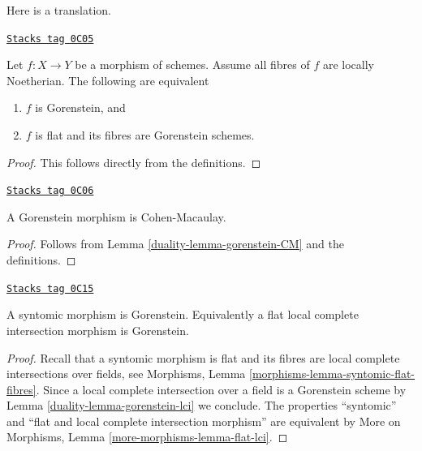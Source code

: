Here is a translation.

\begin{lemma}
\label{duality-lemma-gorenstein-morphism}
\href{https://stacks.math.columbia.edu/tag/0C05}{\texttt{Stacks tag 0C05}}

Let $f : X \to Y$ be a morphism of schemes.
Assume all fibres of $f$ are locally Noetherian.
The following are equivalent
\begin{enumerate}
\item $f$ is Gorenstein, and
\item $f$ is flat and its fibres are Gorenstein schemes.
\end{enumerate}
\end{lemma}

\begin{proof}
This follows directly from the definitions.
\end{proof}

\begin{lemma}
\label{duality-lemma-gorenstein-CM-morphism}
\href{https://stacks.math.columbia.edu/tag/0C06}{\texttt{Stacks tag 0C06}}

A Gorenstein morphism is Cohen-Macaulay.
\end{lemma}

\begin{proof}

Follows from Lemma \ref{duality-lemma-gorenstein-CM} and the definitions.
\end{proof}

\begin{lemma}
\label{duality-lemma-lci-gorenstein}
\href{https://stacks.math.columbia.edu/tag/0C15}{\texttt{Stacks tag 0C15}}

A syntomic morphism is Gorenstein. Equivalently a flat
local complete intersection morphism is Gorenstein.
\end{lemma}

\begin{proof}

Recall that a syntomic morphism is flat and its fibres
are local complete intersections over fields, see
Morphisms, Lemma \ref{morphisms-lemma-syntomic-flat-fibres}.
Since a local complete intersection over a field is a Gorenstein scheme
by Lemma \ref{duality-lemma-gorenstein-lci} we conclude.
The properties ``syntomic'' and ``flat and local
complete intersection morphism'' are equivalent by
More on Morphisms, Lemma \ref{more-morphisms-lemma-flat-lci}.
\end{proof}

